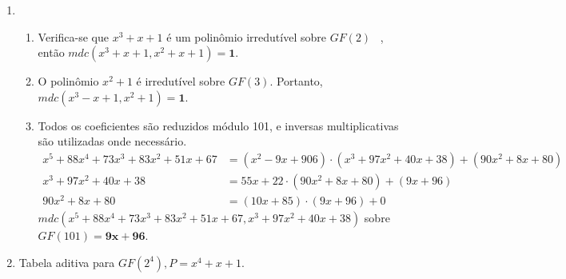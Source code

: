 \documentclass[fleqn]{../sftex/sftex}
\begin{document}
\begin{enumerate}[label= (\textbf{\arabic*})]
\begin{enumerate}
\end{enumerate}

\item

\begin{enumerate}

\item Verifica-se que $x^3 + x + 1$ é um polinômio irredutível sobre $GF(2)$
~\cite{Stallings:2002:CNS:599893}, então $mdc(x^3 + x + 1, x^2 + x + 1) =
\boldsymbol{1}$.

\item O polinômio $x^2 + 1$ é irredutível sobre $GF(3)$. Portanto,
$mdc(x^3 - x + 1, x^2 + 1) = \boldsymbol{1}$.

\item Todos os coeficientes são reduzidos módulo 101, e inversas
multiplicativas são utilizadas onde necessário.
\begin{align*}
x^5 + 88x^4 + 73x^3 + 83x^2 + 51x + 67 &= (x^2 - 9x + 906) \cdot
(x^3 + 97x^2 + 40x + 38) + (90x^2 + 8x + 80) \\
x^3 + 97x^2 + 40x + 38 &= 55x + 22 \cdot (90x^2 + 8x + 80) + (9x + 96) \\
90x^2 + 8x + 80 &= (10x + 85) \cdot (9x + 96) + 0
\end{align*}
$mdc(x^5 + 88x^4 + 73x^3 + 83x^2 + 51x + 67, x^3 + 97x^2 + 40x + 38)$ sobre
$GF(101) = \boldsymbol{9x + 96}$.

\end{enumerate}

\newpage

\item Tabela aditiva para $GF(2^4), P = x^4 + x + 1$.


\end{enumerate}
\end{document}
